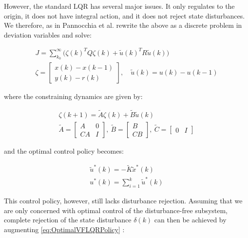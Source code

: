 However, the standard LQR has several major issues. It only regulates to the origin, it does not have integral action, and it does not reject state disturbances. We therefore, as in Pannocchia et al. \cite{Pannocchia2015a} rewrite the above as a discrete problem in deviation variables and solve:

\begin{equation}\label{eq:LagrangeProblemDeviation}
	\begin{gathered}
	J = \sum_{k_0}^{\infty} \big(\zeta(k)^TQ\zeta(k) + \tilde{u}(k)^TR\tilde{u}(k)\big) \\
	\zeta = \begin{bmatrix}	x(k)-x(k-1) \\ y(k)-r(k) \end{bmatrix}, \quad \tilde{u}(k) = u(k)-u(k-1) 
	\end{gathered}
\end{equation} 

where the constraining dynamics are given by:

\begin{equation}\label{eq:VelocityMatrices}
	\begin{gathered}
		\zeta(k+1) = \tilde{A}\zeta(k) + \tilde{B}\tilde{u}(k) \\
		\tilde{A} = \begin{bmatrix} A & 0 \\ CA & I	\end{bmatrix}, \ 
		\tilde{B} = \begin{bmatrix} B \\ CB	\end{bmatrix}, \ \tilde{C} = \begin{bmatrix} 0 & I	\end{bmatrix}
	\end{gathered}
\end{equation}

and the optimal control policy becomes:

\begin{equation}\label{eq:OptimalVFLQRPolicy}
\begin{gathered}
\tilde{u}^*(k) = -\tilde{K}\tilde{x}^*(k) \\
u^*(k) = \sum_{i=1}^{k} \tilde{u}^*(k)
\end{gathered}
\end{equation}

This control policy, however, still lacks disturbance rejection. Assuming that we are only concerned with optimal control of the disturbance-free subsystem, complete rejection of the state disturbance $\delta(k)$ can then be achieved by augmenting \cref{eq:OptimalVFLQRPolicy} \cite{Singh2017}:

